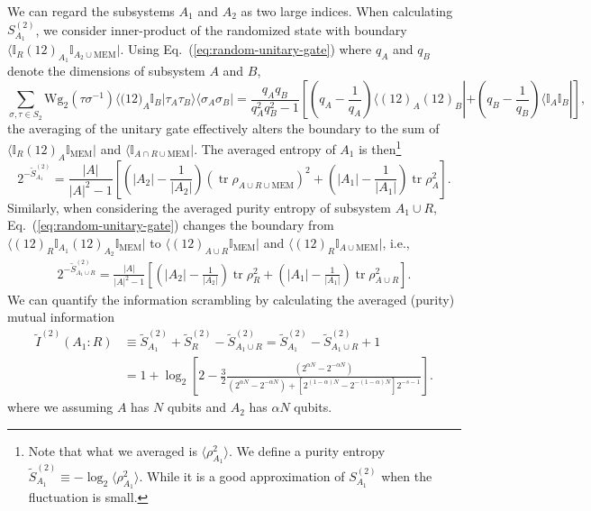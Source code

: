 \documentclass[aps,prb,superscriptaddress,nofootinbib]{revtex4}
\def \tr{\operatorname{tr}}
\begin{document}
We can regard the subsystems $A_1$ and $A_2$ as two large indices.
When calculating $S^{(2)}_{A_1}$, we consider inner-product of the randomized state with boundary $\langle \mathbb I_R(12)_{A_1}\mathbb I_{A_2\cup\text{MEM}}|$.
Using Eq.~(\ref{eq:random-unitary-gate}) where $q_A$ and $q_B$ denote the dimensions of subsystem $A$ and $B$,
\begin{equation}\label{eq:alter-boundary}
	\sum_{\sigma, \tau \in S_2} \mathrm{Wg}_2\left(\tau \sigma^{-1}\right)
	\langle \mathbb (12)_A \mathbb I_B|\tau_A \tau_B\rangle\langle\sigma_A \sigma_B|
	= \frac{q_A q_B}{q_A^2 q_B^2-1} \left[\left(q_A-\frac{1}{q_A}\right) \langle(12)_A(12)_B|+
	\left(q_B-\frac{1}{q_B}\right) \langle\mathbb I_A\mathbb I_B| \right],
\end{equation}
the averaging of the unitary gate effectively alters the boundary to the sum of $\langle \mathbb I_R(12)_{A}\mathbb I_\text{MEM}|$ and $\langle \mathbb I_{A\cap R\cup \text{MEM}}|$.
The averaged entropy of $A_1$ is then\footnote{Note that what we averaged is $\langle \rho^2_{A_1}\rangle$. We define a purity entropy $\tilde S^{(2)}_{A_1} \equiv -\log_2 \langle \rho^2_{A_1}\rangle$. While it is a good approximation of $S^{(2)}_{A_1}$ when the fluctuation is small.}
\begin{equation}
	2^{-\tilde S^{(2)}_{A_1}} 
	= \frac{|A|}{|A|^2-1}\left[\left(|A_2|-\frac{1}{|A_2|}\right)(\tr\rho_{A\cup R\cup\text{MEM}})^2+\left(|A_1|-\frac{1}{|A_1|}\right)\tr\rho^2_A\right].
\end{equation}
Similarly, when considering the averaged purity entropy of subsystem $A_1 \cup R$, Eq.~(\ref{eq:random-unitary-gate}) changes the boundary from $\langle(12)_{R}\mathbb I_{A_1} (12)_{A_2}\mathbb I_\text{MEM}|$ to $\langle (12)_{A\cup R}\mathbb I_\text{MEM}|$ and $\langle(12)_{R}\mathbb I_{A\cup \text{MEM}}|$, i.e.,
\begin{equation}
\begin{aligned}
	2^{-\tilde S^{(2)}_{A_1\cup R}} 
	= \frac{|A|}{|A|^2-1}\left[\left(|A_2|-\frac{1}{|A_2|}\right)\tr\rho^2_R+\left(|A_1|-\frac{1}{|A_1|}\right)\tr\rho^2_{A\cup R}\right].
\end{aligned}
\end{equation}
We can quantify the information scrambling by calculating the averaged (purity) mutual information
\begin{equation}
\begin{aligned}
	\tilde I^{(2)}(A_1: R) &\equiv \tilde S^{(2)}_{A_1} + \tilde S^{(2)}_{R} - \tilde S^{(2)}_{A_1\cup R}
	= \tilde S^{(2)}_{A_1} - \tilde S^{(2)}_{A_1\cup R} + 1 \\
	&= 1 + \log_2 \left[2-\frac{3}{2}\frac{(2^{\alpha N}-2^{-\alpha N})}{(2^{\alpha N}-2^{-\alpha N})+[2^{(1-\alpha)N} - 2^{-(1-\alpha)N}]2^{-s-1}}\right].
\end{aligned}
\end{equation}
where we assuming $A$ has $N$ qubits and $A_2$ has $\alpha N$ qubits.
\end{document}
